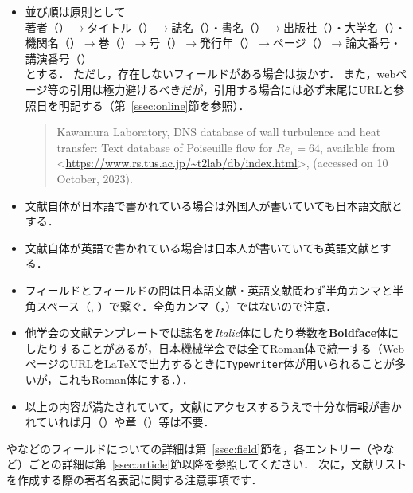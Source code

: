 \documentclass[a4paper,fleqn,uplatex,dvipdfmx]{jsarticle}
\begin{document}
\begin{tcolorbox}[enhanced, title=\textgt{文献リスト作成の注意事項（全体）}, drop fuzzy shadow]
    \begin{itemize}
        \item 並び順は原則として \\
            著者（\ttauthor）$\to$タイトル（\tttitle）$\to$誌名（\ttjournal）・書名（\ttbooktitle）$\to$出版社（\ttpublisher）・大学名（\ttschool）・機関名（\ttinstitution）$\to$巻（\ttvolume）$\to$号（\ttnumber）$\to$発行年（\ttyear）$\to$ページ（\ttpages）$\to$論文番号・講演番号（\ttnote） \\
            とする．
            ただし，存在しないフィールドがある場合は抜かす．
            また，webページ等の引用は極力避けるべきだが，引用する場合には必ず末尾にURLと参照日を明記する（第~\ref{ssec:online}節\ttonline を参照）．
            \begin{quote}
                Kawamura Laboratory, DNS database of wall turbulence and heat transfer: Text database of Poiseuille flow for $\mathit{Re}_\tau = 64$, available from \textless\url{https://www.rs.tus.ac.jp/~t2lab/db/index.html}\textgreater, (accessed on 10 October, 2023).
            \end{quote}
        \item 文献自体が日本語で書かれている場合は外国人が書いていても日本語文献とする．
        \item 文献自体が英語で書かれている場合は日本人が書いていても英語文献とする．
        \item フィールドとフィールドの間は日本語文献・英語文献問わず半角カンマと半角スペース（, ）で繋ぐ．全角カンマ（，）ではないので注意．
        \item 他学会の文献テンプレートでは誌名を\textit{Italic}体にしたり巻数を\textbf{Boldface}体にしたりすることがあるが，日本機械学会では全て\textrm{Roman}体で統一する（WebページのURLを\LaTeX{}で出力するときに\texttt{Typewriter}体が用いられることが多いが，これも\textrm{Roman}体にする．）．
        \item 以上の内容が満たされていて，文献にアクセスするうえで十分な情報が書かれていれば月（\ttmonth）や章（\ttchapter）等は不要．
    \end{itemize}
\end{tcolorbox}
\renewcommand\UrlFont{\ttfamily}
\noindent
\ttauthor や\tttitle などのフィールドについての詳細は第~\ref{ssec:field}節を，各エントリー（\ttarticle や\ttbook など）ごとの詳細は第~\ref{ssec:article}節以降を参照してください．
次に，文献リストを作成する際の著者名表記に関する注意事項です．
\end{document}
